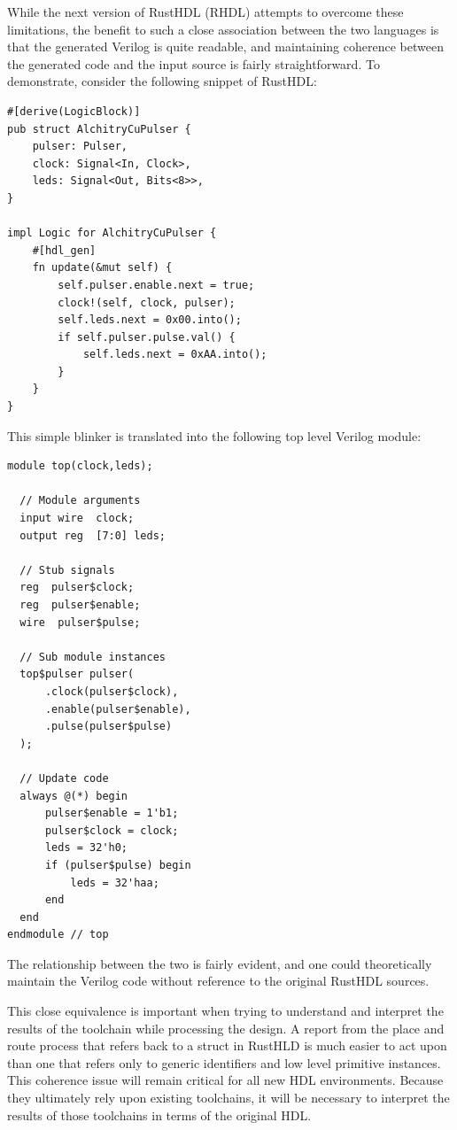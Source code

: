 \documentclass[conference]{IEEEtran}
\begin{document}
While the next version of RustHDL (RHDL) attempts to overcome these limitations, the benefit to such a close 
association between the two languages is that the generated Verilog is quite readable, and maintaining
coherence between the generated code and the input source is fairly straightforward.   
To demonstrate, consider the following snippet of RustHDL:

\begin{verbatim}
#[derive(LogicBlock)]
pub struct AlchitryCuPulser {
    pulser: Pulser,
    clock: Signal<In, Clock>,
    leds: Signal<Out, Bits<8>>,
}

impl Logic for AlchitryCuPulser {
    #[hdl_gen]
    fn update(&mut self) {
        self.pulser.enable.next = true;
        clock!(self, clock, pulser);
        self.leds.next = 0x00.into();
        if self.pulser.pulse.val() {
            self.leds.next = 0xAA.into();
        }
    }
}
\end{verbatim}

This simple blinker is translated into the following top level Verilog module:

\begin{verbatim}
module top(clock,leds);
  
  // Module arguments
  input wire  clock;
  output reg  [7:0] leds;
  
  // Stub signals
  reg  pulser$clock;
  reg  pulser$enable;
  wire  pulser$pulse;
  
  // Sub module instances
  top$pulser pulser(
      .clock(pulser$clock),
      .enable(pulser$enable),
      .pulse(pulser$pulse)
  );
  
  // Update code
  always @(*) begin
      pulser$enable = 1'b1;
      pulser$clock = clock;
      leds = 32'h0;
      if (pulser$pulse) begin
          leds = 32'haa;
      end
  end  
endmodule // top
\end{verbatim}

The relationship between the two is fairly evident, and one could theoretically maintain the Verilog
code without reference to the original RustHDL sources.

This close equivalence is important when trying to understand and interpret 
the results of the toolchain while processing the design.  A report from the place and route 
process that refers back to a struct in RustHLD is much easier to act upon than one that 
refers only to generic identifiers and low level primitive instances. This coherence issue will remain 
critical for all new HDL environments.  Because 
they ultimately rely upon existing toolchains, it will be necessary to interpret the results of those toolchains
in terms of the original HDL.
\end{document}
